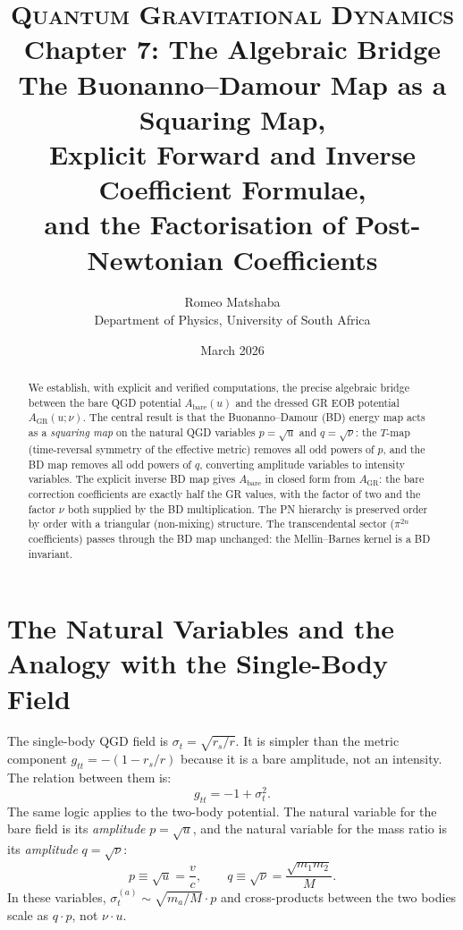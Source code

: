 \documentclass[11pt,a4paper]{article}
\title{%
  \vspace{-1.2cm}
  {\large\scshape Quantum Gravitational Dynamics}\\[6pt]
  {\LARGE\bfseries Chapter 7: The Algebraic Bridge}\\[8pt]
  {\normalsize The Buonanno--Damour Map as a Squaring Map,\\
  Explicit Forward and Inverse Coefficient Formulae,\\
  and the Factorisation of Post-Newtonian Coefficients}
}
\author{%
  Romeo Matshaba\\[4pt]
  \normalsize Department of Physics, University of South Africa
}
\date{March 2026}
\theoremstyle{plain}
\theoremstyle{definition}
\theoremstyle{remark}
\newcommand{\sigt}{\sigma_t}
\newcommand{\GR}{\mathrm{GR}}
\newcommand{\bare}{\mathrm{bare}}
\begin{document}
\maketitle
\thispagestyle{empty}

\begin{abstract}
\noindent
We establish, with explicit and verified computations, the precise algebraic
bridge between the bare QGD potential $A_\bare(u)$ and the dressed GR EOB
potential $A_\GR(u;\nu)$.  The central result is that the Buonanno--Damour (BD)
energy map acts as a \emph{squaring map} on the natural QGD variables
$p=\sqrt{u}$ and $q=\sqrt{\nu}$: the $T$-map (time-reversal symmetry of the
effective metric) removes all odd powers of $p$, and the BD map removes all
odd powers of $q$, converting amplitude variables to intensity variables.  The
explicit inverse BD map gives $A_\bare$ in closed form from $A_\GR$: the bare
correction coefficients are exactly half the GR values, with the factor of two
and the factor $\nu$ both supplied by the BD multiplication.  The PN hierarchy
is preserved order by order with a triangular (non-mixing) structure.  The
transcendental sector ($\pi^{2n}$ coefficients) passes through the BD map
unchanged: the Mellin--Barnes kernel is a BD invariant.
\end{abstract}

\tableofcontents
\newpage

\section{The Natural Variables and the Analogy with the Single-Body Field}
\label{sec:variables}

The single-body QGD field is $\sigt = \sqrt{r_s/r}$.  It is simpler than the metric component $g_{tt} = -(1-r_s/r)$ because it is a bare amplitude, not an intensity.  The relation between them is:
\begin{equation}
  g_{tt} = -1 + \sigt^2.
\end{equation}
The same logic applies to the two-body potential.  The natural variable for the bare field is its \emph{amplitude} $p = \sqrt{u}$, and the natural variable for the mass ratio is its \emph{amplitude} $q = \sqrt{\nu}$:
\begin{equation}
  p \equiv \sqrt{u} = \frac{v}{c},
  \qquad
  q \equiv \sqrt{\nu} = \frac{\sqrt{m_1 m_2}}{M}.
\end{equation}
In these variables, $\sigt^{(a)} \sim \sqrt{m_a/M}\cdot p$ and cross-products between the two bodies scale as $q\cdot p$, not $\nu\cdot u$.
\end{document}
